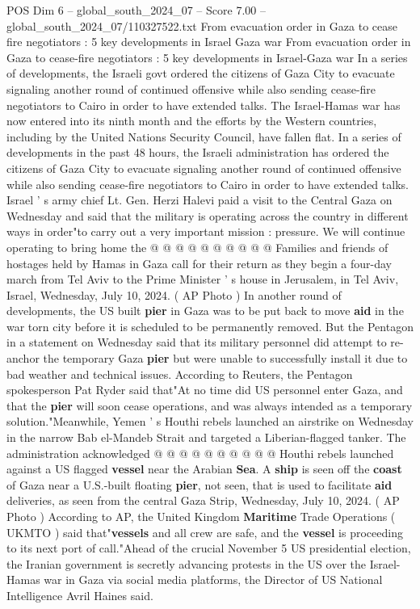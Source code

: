 \begin{textsample}{POS Dim 6 – global\_south\_2024\_07 – Score 7.00 – global\_south\_2024\_07/110327522.txt}  \label{ex:f6_pos_312}
From evacuation order in Gaza to cease fire negotiators : 5 key developments in Israel Gaza war From evacuation order in Gaza to cease-fire negotiators : 5 key developments in Israel-Gaza war In a series of developments, the Israeli govt ordered the citizens of Gaza City to evacuate signaling another round of continued offensive while also sending cease-fire negotiators to Cairo in order to have extended talks.
The Israel-Hamas war has now entered into its ninth month and the efforts by the Western countries, including by the United Nations Security Council, have fallen flat.
In a series of developments in the past 48 hours, the Israeli administration has ordered the citizens of Gaza City to evacuate signaling another round of continued offensive while also sending cease-fire negotiators to Cairo in order to have extended talks.
Israel ' s army chief Lt.
Gen.
Herzi Halevi paid a visit to the Central Gaza on Wednesday and said that the military is operating across the country in different ways in order"to carry out a very important mission : pressure.
We will continue operating to bring home the @ @ @ @ @ @ @ @ @ @ Families and friends of hostages held by Hamas in Gaza call for their return as they begin a four-day march from Tel Aviv to the Prime Minister ' s house in Jerusalem, in Tel Aviv, Israel, Wednesday, July 10, 2024. ( AP Photo ) In another round of developments, the US built \textbf{pier} in Gaza was to be put back to move \textbf{aid} in the war torn city before it is scheduled to be permanently removed.
But the Pentagon in a statement on Wednesday said that its military personnel did attempt to re-anchor the temporary Gaza \textbf{pier} but were unable to successfully install it due to bad weather and technical issues.
According to Reuters, the Pentagon spokesperson Pat Ryder said that"At no time did US personnel enter Gaza, and that the \textbf{pier} will soon cease operations, and was always intended as a temporary solution."Meanwhile, Yemen ' s Houthi rebels launched an airstrike on Wednesday in the narrow Bab el-Mandeb Strait and targeted a Liberian-flagged tanker.
The administration acknowledged @ @ @ @ @ @ @ @ @ @ Houthi rebels launched against a US flagged \textbf{vessel} near the Arabian \textbf{Sea}.
A \textbf{ship} is seen off the \textbf{coast} of Gaza near a U.S.-built floating \textbf{pier}, not seen, that is used to facilitate \textbf{aid} deliveries, as seen from the central Gaza Strip, Wednesday, July 10, 2024. ( AP Photo ) According to AP, the United Kingdom \textbf{Maritime} Trade Operations ( UKMTO ) said that"\textbf{vessels} and all crew are safe, and the \textbf{vessel} is proceeding to its next port of call."Ahead of the crucial November 5 US presidential election, the Iranian government is secretly advancing protests in the US over the Israel-Hamas war in Gaza via social media platforms, the Director of US National Intelligence Avril Haines said.

\end{textsample}
